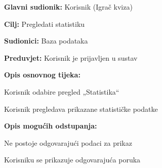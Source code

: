 			
				\noindent {}
				\begin{packed_item}
					
					\item \textbf{Glavni sudionik:} Korisnik (Igrač kviza)
					\item  \textbf{Cilj:} Pregledati statistiku 
					\item  \textbf{Sudionici:} Baza podataka
					\item  \textbf{Preduvjet:} Korisnik je prijavljen u sustav
					\item  \textbf{Opis osnovnog tijeka:}
					
					\item[] \begin{packed_enum}
						
						\item Korisnik odabire pregled „Statistika“
						\item Korisnik pregledava prikazane statističke podatke
					\end{packed_enum}
					
					\item  \textbf{Opis mogućih odstupanja:}
					
					\item[] \begin{packed_item}
						
						\item[2.a] Ne postoje odgovarajući podaci za prikaz
						\item[] \begin{packed_enum}
							
							\item Korisniku se prikazuje odgovarajuća poruka
							
						\end{packed_enum}
						
					\end{packed_item}
				\end{packed_item}
		
